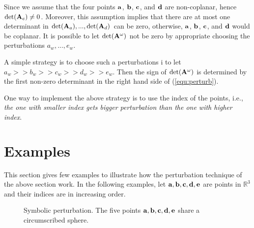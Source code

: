 Since we assume that the four points ${\bf a}$, ${\bf b}$, ${\bf c}$, and ${\bf d}$ are non-coplanar, hence $\textrm{det}({\bf A}_e) \neq 0$. Moreover, this assumption implies that there are at most one determinant in $\textrm{det}({\bf A}_a), ..., \textrm{det}({\bf A}_d)$ can be zero, otherwise, ${\bf a}$, ${\bf b}$, ${\bf c}$, and ${\bf d}$ would be coplanar. It is possible to let $\textrm{det}({\bf A}^{\omega})$ not be zero by appropriate choosing the perturbations $a_w, ..., e_w$.

A simple strategy is to choose such a perturbations i to let $a_w >> b_w >> c_w >> d_w >> e_w$. Then the sign of $\textrm{det}({\bf A}^{\omega})$ is determined by the first non-zero determinant in the right hand side of (\ref{equ:perturb}). 

One way to implement the above strategy is to use the index of the points, i.e., {\it the one with smaller index gets bigger perturbation than the one with higher index}.

\section{Examples}

This section gives few examples to illustrate how the perturbation technique of the above section work.  In the following examples, let ${\bf a}, {\bf b}, {\bf c}, {\bf d}, {\bf e}$ are points in $\mathbb{R}^3$ and their indices are in increasing order.

\begin{figure}
\caption{Symbolic perturbation. The five points ${\bf a}, {\bf b}, {\bf c}, {\bf d}, {\bf e}$ share a circumscribed sphere.}
\label{fig:ex1}
\end{figure}

